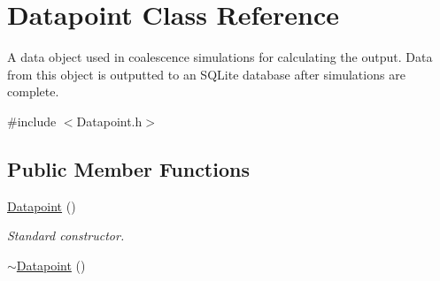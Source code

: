 \hypertarget{class_datapoint}{}\section{Datapoint Class Reference}
\label{class_datapoint}


A data object used in coalescence simulations for calculating the output. Data from this object is outputted to an S\+Q\+Lite database after simulations are complete.  




{\ttfamily \#include $<$Datapoint.\+h$>$}

\subsection*{Public Member Functions}
\begin{DoxyCompactItemize}
\item 
\hyperlink{class_datapoint_ad86563f411c605764c69f64767ed9fef}{Datapoint} ()\hypertarget{class_datapoint_ad86563f411c605764c69f64767ed9fef}{}\label{class_datapoint_ad86563f411c605764c69f64767ed9fef}

\begin{DoxyCompactList}\small\item\em Standard constructor. \end{DoxyCompactList}\item 
\hyperlink{class_datapoint_a88c3068213a8e9ba32d4636ba9e5b36e}{$\sim$\+Datapoint} ()\hypertarget{class_datapoint_a88c3068213a8e9ba32d4636ba9e5b36e}{}\label{class_datapoint_a88c3068213a8e9ba32d4636ba9e5b36e}


\end{DoxyCompactItemize}
